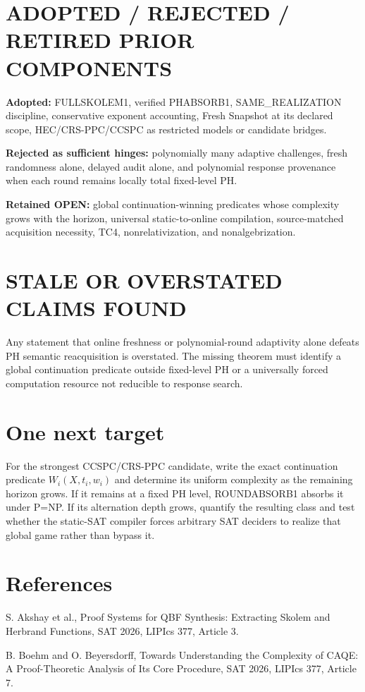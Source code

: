 \documentclass[11pt]{article}
\begin{document}
\section*{ADOPTED / REJECTED / RETIRED PRIOR COMPONENTS}
\textbf{Adopted:} FULLSKOLEM1, verified PHABSORB1, SAME\_REALIZATION discipline, conservative exponent accounting, Fresh Snapshot at its declared scope, HEC/CRS-PPC/CCSPC as restricted models or candidate bridges.

\textbf{Rejected as sufficient hinges:} polynomially many adaptive challenges, fresh randomness alone, delayed audit alone, and polynomial response provenance when each round remains locally total fixed-level PH.

\textbf{Retained OPEN:} global continuation-winning predicates whose complexity grows with the horizon, universal static-to-online compilation, source-matched acquisition necessity, TC4, nonrelativization, and nonalgebrization.

\section*{STALE OR OVERSTATED CLAIMS FOUND}
Any statement that online freshness or polynomial-round adaptivity alone defeats PH semantic reacquisition is overstated. The missing theorem must identify a global continuation predicate outside fixed-level PH or a universally forced computation resource not reducible to response search.

\section*{One next target}
For the strongest CCSPC/CRS-PPC candidate, write the exact continuation predicate $W_i(X,t_i,w_i)$ and determine its uniform complexity as the remaining horizon grows. If it remains at a fixed PH level, ROUNDABSORB1 absorbs it under P=NP. If its alternation depth grows, quantify the resulting class and test whether the static-SAT compiler forces arbitrary SAT deciders to realize that global game rather than bypass it.

\section*{References}
S. Akshay et al., Proof Systems for QBF Synthesis: Extracting Skolem and Herbrand Functions, SAT 2026, LIPIcs 377, Article 3.

B. Boehm and O. Beyersdorff, Towards Understanding the Complexity of CAQE: A Proof-Theoretic Analysis of Its Core Procedure, SAT 2026, LIPIcs 377, Article 7.
\end{document}
